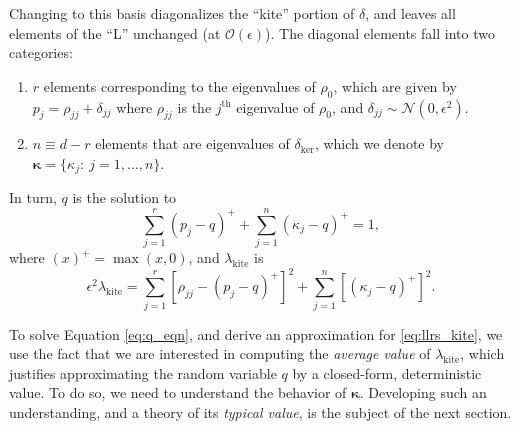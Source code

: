 \documentclass[aps,pra, twocolumn]{revtex4-1}
\newcommand{\bvec}[1]{\boldsymbol{#1}}
\begin{document}
Changing to this basis diagonalizes the ``kite'' portion of $\delta$, and leaves all elements of the ``L'' unchanged (at $\mathcal{O}(\epsilon)$).  The diagonal elements fall into two categories:
\begin{enumerate}[noitemsep]
\item $r$ elements corresponding to the eigenvalues of $\rho_0$, which are given by $p_{j} = \rho_{jj} + \delta_{jj}$ where  $\rho_{jj}$ is the $j^{\mathrm{th}}$ eigenvalue of $\rho_{0}$, and $\delta_{jj} \sim \mathcal{N}(0,\epsilon^2)$.
\item $n \equiv d-r$ elements that are eigenvalues of $\delta_{\mathrm{ker}}$, which we denote by $\bvec{\kappa} = \{\kappa_j:~j = 1,\ldots, 
n\}$.
\end{enumerate}
In turn, $q$ is the solution to
\begin{equation}
\label{eq:q_eqn}
 \sum_{j=1}^{r}(p_j - q)^{+} + \sum_{j=1}^{n}{(\kappa_j-q)^+} = 1,
\end{equation}
where $(x)^{+} = \max(x, 0)$, and $\lambda_{\mathrm{kite}}$ is
\begin{equation}
\label{eq:llrs_kite}
\epsilon^{2}\lambda_{\mathrm{kite}} = \sum_{j=1}^{r}[\rho_{jj}- (p_j-q)^{+}]^2 + \sum_{j=1}^{n}\left[(\kappa_j-q)^+\right]^2.
\end{equation}
 
To solve Equation \eqref{eq:q_eqn}, and derive an approximation for \eqref{eq:llrs_kite}, we use the fact that we are interested in computing the \emph{average value} of $\lambda_{\mathrm{kite}}$, which justifies approximating the random variable $q$ by a closed-form, deterministic value. To do so, we need to understand the behavior of $\bvec{\kappa}$. Developing such an understanding, and a theory of its \emph{typical value}, is the subject of the next section.
\end{document}
